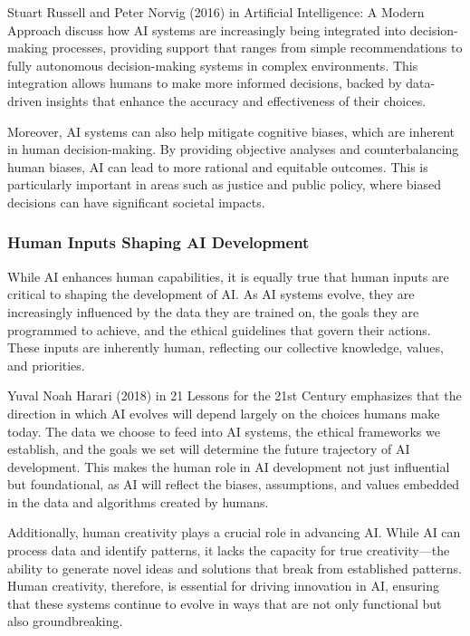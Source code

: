 \documentclass[12pt,twoside]{article}
\begin{document}
Stuart Russell and Peter Norvig (2016) in Artificial Intelligence: A Modern Approach discuss how AI systems are increasingly being integrated into decision-making processes, providing support that ranges from simple recommendations to fully autonomous decision-making systems in complex environments. This integration allows humans to make more informed decisions, backed by data-driven insights that enhance the accuracy and effectiveness of their choices.

Moreover, AI systems can also help mitigate cognitive biases, which are inherent in human decision-making. By providing objective analyses and counterbalancing human biases, AI can lead to more rational and equitable outcomes. This is particularly important in areas such as justice and public policy, where biased decisions can have significant societal impacts.

\subsubsection{Human Inputs Shaping AI Development}

While AI enhances human capabilities, it is equally true that human inputs are critical to shaping the development of AI. As AI systems evolve, they are increasingly influenced by the data they are trained on, the goals they are programmed to achieve, and the ethical guidelines that govern their actions. These inputs are inherently human, reflecting our collective knowledge, values, and priorities.

Yuval Noah Harari (2018) in 21 Lessons for the 21st Century emphasizes that the direction in which AI evolves will depend largely on the choices humans make today. The data we choose to feed into AI systems, the ethical frameworks we establish, and the goals we set will determine the future trajectory of AI development. This makes the human role in AI development not just influential but foundational, as AI will reflect the biases, assumptions, and values embedded in the data and algorithms created by humans.

Additionally, human creativity plays a crucial role in advancing AI. While AI can process data and identify patterns, it lacks the capacity for true creativity—the ability to generate novel ideas and solutions that break from established patterns. Human creativity, therefore, is essential for driving innovation in AI, ensuring that these systems continue to evolve in ways that are not only functional but also groundbreaking.
\end{document}
